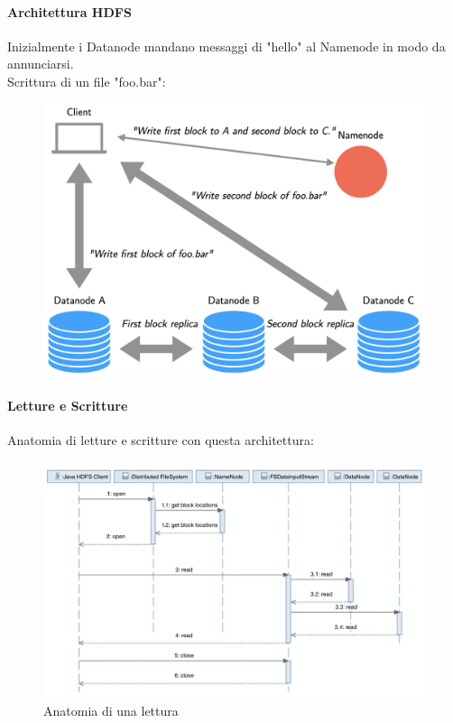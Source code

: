 \documentclass{article}
\begin{document}
\begin{appendices}
\paragraph{Architettura HDFS}
Inizialmente i Datanode mandano messaggi di "hello" al Namenode in modo da annunciarsi. \\
Scrittura di un file "foo.bar":
\begin{figure}[H]
    \centering
    \includegraphics[scale=0.3]{img/architettura HDFS.png}
\end{figure}\noindent

\paragraph{Letture e Scritture}
Anatomia di letture e scritture con questa architettura:
\begin{figure}[H]
    \centering
    \includegraphics[scale=0.3]{img/lettura.png}
    \caption{Anatomia di una lettura}
\end{figure}\noindent


\end{appendices}
\end{document}
